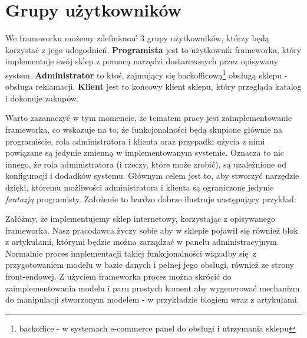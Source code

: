 \section{Grupy użytkowników}
We frameworku możemy zdefiniować 3 grupy użytkowników, którzy będą korzystać z jego udogodnień. \textbf{Programista} jest to użytkownik frameworka, który implementuje swój sklep z pomocą narzędzi dostarczonych przez opisywany system. \textbf{Administrator} to ktoś, zajmujący się backofficową\footnote{backoffice - w systemach e-commerce panel do obsługi i utrzymania sklepu} obsługą sklepu - obsługa reklamacji. \textbf{Klient} jest to końcowy klient sklepu, który przegląda katalog i dokonuje zakupów. 

Warto zazanaczyć w tym momencie, że tematem pracy jest zaimplementowanie frameworka, co wskazuje na to, że funkcjonalności będą skupione głównie na programiście, rola administratora i klienta oraz przypadki użycia z nimi powiązane są jedynie zmienną w implementowanym systemie. Oznacza to nic innego, że rola administratora (i rzeczy, które może zrobić), są uzależnione od konfiguracji i dodadków systemu. Głównym celem jest to, aby stworzyć narzędzie dzięki, któremu możliwości administratora i klienta są ograniczone jedynie \textit{fantazją} programisty. Założenie to bardzo dobrze ilustruje następujący przykład:
\begin{example}
	Załóżmy, że implementujemy sklep internetowy, korzystając z opisywanego frameworka. Nasz pracodawca życzy sobie aby w sklepie pojawił się również blok z artykułami, którymi będzie można zarządzać w panelu administracyjnym. Normalnie proces implementacji takiej funkcjonalności wiązałby się z przygotowaniem modelu w bazie danych i pełnej jego obsługi, również ze strony front-endowej. Z użyciem frameworka proces można skrócić do zaimplementowania modelu i paru prostych koment aby wygenerować mechanizm do manipulacji stworzonym modelem - w przykładzie blogiem wraz z artykułami. 
\end{example}

